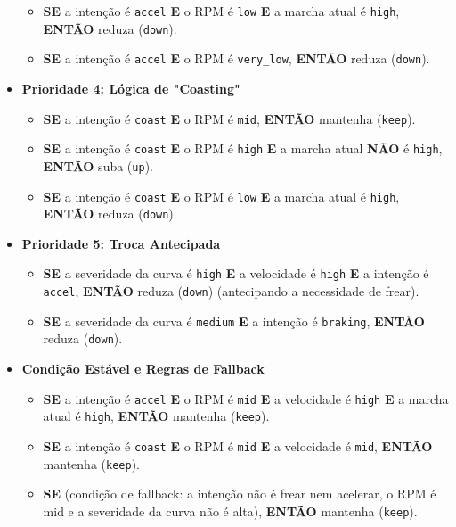 \documentclass[12pt]{article}
\begin{document}
\begin{itemize}[label=\textbullet, leftmargin=*]
\begin{itemize}
        \item \textbf{SE} a intenção é \texttt{accel} \textbf{E} o RPM é \texttt{low} \textbf{E} a marcha atual é \texttt{high}, \textbf{ENTÃO} reduza (\texttt{down}).
        \item \textbf{SE} a intenção é \texttt{accel} \textbf{E} o RPM é \texttt{very\_low}, \textbf{ENTÃO} reduza (\texttt{down}).
    \end{itemize}
    \item \textbf{Prioridade 4: Lógica de "Coasting"}
    \begin{itemize}
        \item \textbf{SE} a intenção é \texttt{coast} \textbf{E} o RPM é \texttt{mid}, \textbf{ENTÃO} mantenha (\texttt{keep}).
        \item \textbf{SE} a intenção é \texttt{coast} \textbf{E} o RPM é \texttt{high} \textbf{E} a marcha atual \textbf{NÃO} é \texttt{high}, \textbf{ENTÃO} suba (\texttt{up}).
        \item \textbf{SE} a intenção é \texttt{coast} \textbf{E} o RPM é \texttt{low} \textbf{E} a marcha atual é \texttt{high}, \textbf{ENTÃO} reduza (\texttt{down}).
    \end{itemize}
    \item \textbf{Prioridade 5: Troca Antecipada}
    \begin{itemize}
        \item \textbf{SE} a severidade da curva é \texttt{high} \textbf{E} a velocidade é \texttt{high} \textbf{E} a intenção é \texttt{accel}, \textbf{ENTÃO} reduza (\texttt{down}) (antecipando a necessidade de frear).
        \item \textbf{SE} a severidade da curva é \texttt{medium} \textbf{E} a intenção é \texttt{braking}, \textbf{ENTÃO} reduza (\texttt{down}).
    \end{itemize}
    \item \textbf{Condição Estável e Regras de Fallback}
    \begin{itemize}
        \item \textbf{SE} a intenção é \texttt{accel} \textbf{E} o RPM é \texttt{mid} \textbf{E} a velocidade é \texttt{high} \textbf{E} a marcha atual é \texttt{high}, \textbf{ENTÃO} mantenha (\texttt{keep}).
        \item \textbf{SE} a intenção é \texttt{coast} \textbf{E} o RPM é \texttt{mid} \textbf{E} a velocidade é \texttt{mid}, \textbf{ENTÃO} mantenha (\texttt{keep}).
        \item \textbf{SE} (condição de fallback: a intenção não é frear nem acelerar, o RPM é mid e a severidade da curva não é alta), \textbf{ENTÃO} mantenha (\texttt{keep}).
    \end{itemize}
\end{itemize}
\end{document}
